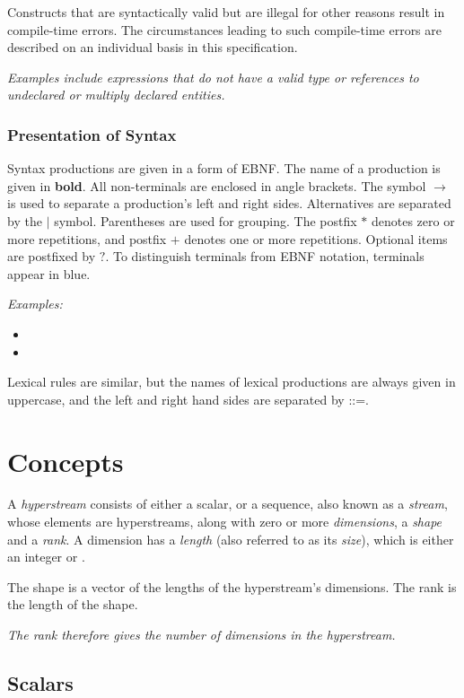 \documentclass{article}
\begin{document}
Constructs that are syntactically valid but are illegal for other reasons result in compile-time errors. The circumstances leading to such compile-time errors are described on an individual basis in this specification.

{\em
Examples include expressions that do not have a valid type or references to undeclared or multiply declared entities.
}

\subsubsection{Presentation of Syntax}

Syntax productions are given in a form of EBNF. The name of a production is given in {\bf bold}.  All non-terminals are enclosed in angle brackets. The symbol $\rightarrow$ is used to separate a production's left and right sides. Alternatives are separated by the $|$ symbol. Parentheses are used for grouping. The postfix $*$ denotes zero or more repetitions, and postfix $+$ denotes one or more repetitions. Optional items are postfixed by $?$. To distinguish terminals from EBNF notation, terminals appear in {\color{blue} blue}.

{\em Examples:}
\begin{itemize}
\item \BuiltinType
\item  \HyperstreamLiteral
\end{itemize}


Lexical rules are similar, but the names of lexical productions are always given in uppercase, and the left and right hand sides are separated by ::=.


\section{Concepts}
\label{concepts}

A {\em hyperstream} consists of either a scalar, or a sequence, also known as a {\em stream}, whose elements are hyperstreams, along with 
 zero or more {\em dimensions}, a {\em shape} and a {\em rank}. A dimension has a {\em length} (also referred to as its {\em size}), which is either an integer or \QUESTIONMARK.

The shape is a vector of the lengths of the hyperstream's dimensions. The rank is the length of the shape.

{\em
The rank therefore gives the number of dimensions in the hyperstream.
}

\subsection{Scalars}
\label{scalars}
\end{document}
